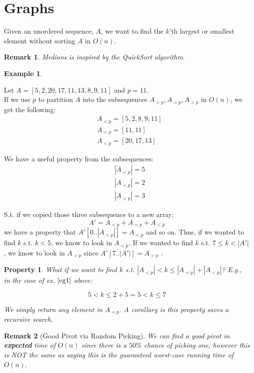 \documentclass{article}
\newtheorem{property}{Property}[section]
\newtheorem{eg}{Example}
\newtheorem{remark}{Remark}
\begin{document}
	
\section{Graphs}
Given an unordered sequence, $A$, we want to find the $k$'th largest or smallest element without sorting $A$ in $O(n)$. 

\begin{remark}
\label{bc1}	
Medians is inspired by the QuickSort algorithm.
\end{remark}

\begin{eg}
\label{eg1}
\end{eg}
Let $A = [5,2,20,17,11,13,8,9,11]$ and $p = 11$.\\
If we use $p$ to partition $A$ into the subsequences $A_{<p}, A_{=p}, A_{>p}$ in $O(n)$, we get the following:\\

\begin{align*}
&A_{<p} = [5,2,8,9,11]\\
&A_{=p} = [11,11]\\
&A_{<p} = [20,17,13]
\end{align*}

We have a useful property from the subsequences:
\begin{align*}
&|A_{<p}| = 5\\
&|A_{=p}| = 2\\
&|A_{>p}| = 3
\end{align*}

S.t. if we copied those three subsequence to a new array: $$A'= A_{<p} + A_{=p} + A_{<p}$$ we have a property that $A'[0..|A_{<p}|] = A_{<p}$ and so on. Thus, if we wanted to find $k$ s.t. $k<5$, we know to look in $A_{<p}$. If we wanted to find $k$ s.t. $7 \leq k < |A'|$, we know to look in $A_{>p}$ since $A'[7..|A'|] = A_{>p}$ .

\begin{property}
\label{p1}
What if we want to find $k$ s.t. $|A_{<p}| < k \leq |A_{=p}|+|A_{<p}|$? E.g., in the case of ex. $\ref{eg1}$ above: 

$$5 < k \leq 2+5 = 5 < k \leq 7$$

We simply return any element in $A_{=p}$. A corollary is this property saves a recursive search.
\end{property}

\begin{remark}[Good Pivot via Random Picking]
We can find a good pivot in \textbf{expected} time of $O(n)$ since there is a $50\%$ chance of picking one, however this is NOT the same as saying this is the guaranteed worst-case running time of $O(n)$.
\end{remark}
\end{document}

